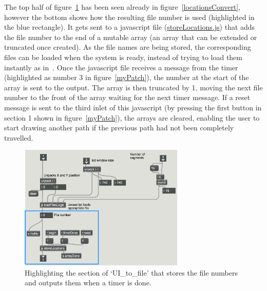 \documentclass[../../main.tex]{subfiles}
\begin{document}
		 	The top half of figure~\ref{storeLocations} has been seen already in figure~\ref{locationsConvert}, however the bottom shows how the resulting file number is used (highlighted in the blue rectangle). It gets sent to a javascript file (\href{http://lt669.github.io/code/javascript/html/storeLocations.html}{storeLocations.js}) that adds the file number to the end of a mutable array (an array that can be extended or truncated once created). As the file names are being stored, the corresponding files can be loaded when the system is ready, instead of trying to load them instantly as in~. Once the javascript file receives a message from the timer (highlighted as number 3 in figure~\ref{myPatch}), the number at the start of the array is sent to the output. The array is then truncated by 1, moving the next file number to the front of the array waiting for the next timer message. If a reset message is sent to the third inlet of this javascript (by pressing the first button in section 1 shown in figure~\ref{myPatch}), the arrays are cleared, enabling the user to start drawing another path if the previous path had not been completely travelled.

			\begin{figure}[H]
				\centerline{\includegraphics[width=0.7\textwidth]{Sections/Implementation/Max/images/Max/Iteration3/storeLocations_edit2.png}}
				\caption{Highlighting the section of `UI\_to\_file' that stores the file numbers and outputs them when a timer is done.}
				\label{storeLocations}
			\end{figure}
\end{document}
